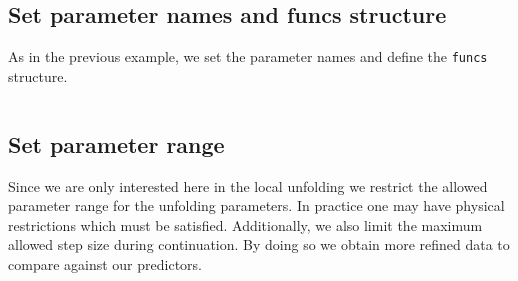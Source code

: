 \subsection{Set parameter names and funcs structure} 
\label{sm:sec:neural_network_model:pars_and_funcs}
As in the previous example, we set the parameter names and define the \texttt{funcs} structure.
\inputminted[firstline=28, lastline=39]{MATLAB}{\pathToDDEBifToolDemos/neural_network_model/neural_network_model.m}

\subsection{Set parameter range}
Since we are only interested here in the local unfolding we restrict the
allowed parameter range for the unfolding parameters. In practice one may have
physical restrictions which must be satisfied. Additionally, we also limit the
maximum allowed step size during continuation. By doing so we obtain more refined
data to compare against our predictors.
\inputminted[firstline=41, lastline=44]{MATLAB}{\pathToDDEBifToolDemos/neural_network_model/neural_network_model.m}

